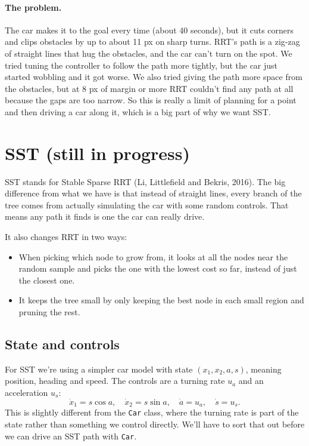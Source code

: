 \documentclass[11pt]{article}
\newcommand{\code}[1]{\texttt{#1}}
\begin{document}
\paragraph{The problem.} The car makes it to the goal every time (about 40 seconds), but it cuts corners
and clips obstacles by up to about 11 px on sharp turns. RRT's path is a zig-zag of straight lines that
hug the obstacles, and the car can't turn on the spot. We tried tuning the controller to follow the path
more tightly, but the car just started wobbling and it got worse. We also tried giving the path more space
from the obstacles, but at 8 px of margin or more RRT couldn't find any path at all because the gaps are
too narrow. So this is really a limit of planning for a point and then driving a car along it, which is a
big part of why we want SST.

\section{SST (still in progress)}

SST stands for Stable Sparse RRT (Li, Littlefield and Bekris, 2016). The big difference from what we
have is that instead of straight lines, every branch of the tree comes from actually simulating the car
with some random controls. That means any path it finds is one the car can really drive.

It also changes RRT in two ways:
\begin{itemize}
  \item When picking which node to grow from, it looks at all the nodes near the random sample and picks
    the one with the lowest cost so far, instead of just the closest one.
  \item It keeps the tree small by only keeping the best node in each small region and pruning the rest.
\end{itemize}

\subsection{State and controls}
For SST we're using a simpler car model with state $(x_1, x_2, a, s)$, meaning position, heading and
speed. The controls are a turning rate $u_a$ and an acceleration $u_s$:
\[
  \dot x_1 = s\cos a, \quad \dot x_2 = s\sin a, \quad \dot a = u_a, \quad \dot s = u_s.
\]
This is slightly different from the \code{Car} class, where the turning rate is part of the state rather
than something we control directly. We'll have to sort that out before we can drive an SST path with
\code{Car}.
\end{document}
